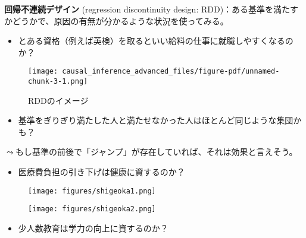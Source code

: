 \documentclass[
  xelatex,
  ja=standard]{bxjsarticle}
\providecommand{\tightlist}{%
  \setlength{\itemsep}{0pt}\setlength{\parskip}{0pt}}\usepackage{longtable,booktabs,array}
\begin{document}
\textbf{回帰不連続デザイン} (regression discontinuity design:
RDD)：ある基準を満たすかどうかで、原因の有無が分かるような状況を使ってみる。

\begin{itemize}
\tightlist
\item
  とある資格（例えば英検）を取るといい給料の仕事に就職しやすくなるのか？
\end{itemize}

\begin{figure}[htpb]

{\centering \texttt{[image: causal\_inference\_advanced\_files/figure-pdf/unnamed-chunk-3-1.png]}

}

\caption{RDDのイメージ}

\end{figure}

\begin{itemize}
\tightlist
\item
  基準をぎりぎり満たした人と満たせなかった人はほとんど同じような集団かも？
\end{itemize}

\(\leadsto\)もし基準の前後で「ジャンプ」が存在していれば、それは効果と言えそう。

\begin{itemize}
\tightlist
\item
  医療費負担の引き下げは健康に資するのか？
\end{itemize}

\begin{figure}[htpb]

{\centering \texttt{[image: figures/shigeoka1.png]}

}

\caption{\citet{shigeoka2014}}

\end{figure}

\begin{figure}[htpb]

{\centering \texttt{[image: figures/shigeoka2.png]}

}

\caption{\citet{shigeoka2014}}

\end{figure}

\begin{itemize}
\tightlist
\item
  少人数教育は学力の向上に資するのか？
\end{itemize}
\end{document}
